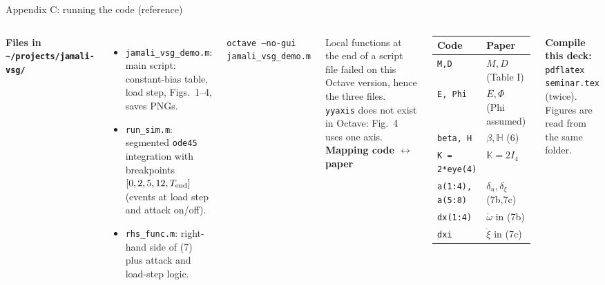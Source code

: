 \documentclass[aspectratio=169,9pt]{beamer}
\newcommand{\bbK}{\mathbb{K}}
\newcommand{\bbH}{\mathbb{H}}
\begin{document}
\begin{frame}[t]{Appendix C: running the code (reference)}
\footnotesize
\begin{columns}[T]
\textbf{Files in \texttt{\textasciitilde/projects/jamali-vsg/}}
\begin{itemize}
\item \texttt{jamali\_vsg\_demo.m}: main script: constant-bias table, load step, Figs.~1--4, saves PNGs.
\item \texttt{run\_sim.m}: segmented \texttt{ode45} integration with breakpoints $[0,2,5,12,T_{\rm end}]$ (events at load step and attack on/off).
\item \texttt{rhs\_func.m}: right-hand side of (7) plus attack and load-step logic.
\end{itemize}
\texttt{octave --no-gui jamali\_vsg\_demo.m}

Local functions at the end of a script file failed on this Octave version, hence the three files. \texttt{yyaxis} does not exist in Octave: Fig.~4 uses one axis.
\textbf{Mapping code $\leftrightarrow$ paper}
\begin{center}
\begin{tabular}{@{}ll@{}}
\toprule
Code & Paper\\
\midrule
\texttt{M,D} & $M,D$ (Table I)\\
\texttt{E, Phi} & $E,\Phi$ (Phi assumed)\\
\texttt{beta, H} & $\beta,\bbH$ (6)\\
\texttt{K = 2*eye(4)} & $\bbK=2I_4$\\
\texttt{a(1:4), a(5:8)} & $\delta_u,\delta_\xi$ (7b,7c)\\
\texttt{dx(1:4)} & $\dot\omega$ in (7b)\\
\texttt{dxi} & $\dot\xi$ in (7c)\\
\bottomrule
\end{tabular}
\end{center}
\textbf{Compile this deck:} \texttt{pdflatex seminar.tex} (twice). Figures are read from the same folder.
\end{columns}
\end{frame}
\end{document}
